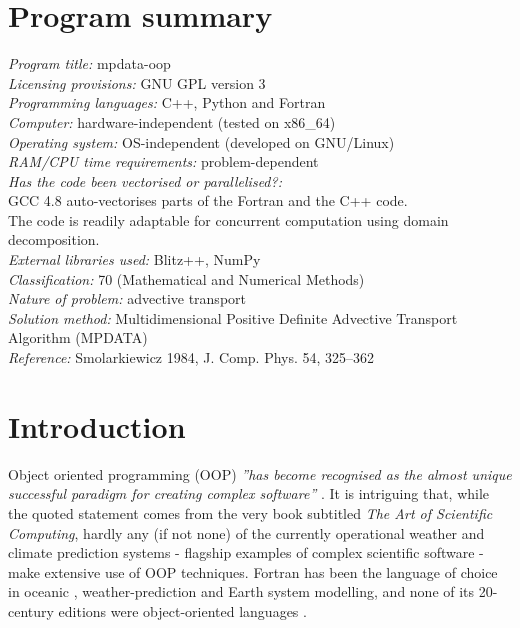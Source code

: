 \documentclass[review,peprint,10pt,5p,times]{elsarticle}
\begin{document}
\section*{Program summary}
\noindent
{\it Program title:} mpdata-oop\\
{\it Licensing provisions:} GNU GPL version 3\\
{\it Programming languages:} C++, Python and Fortran\\
{\it Computer:} hardware-independent (tested on x86\_64)\\
{\it Operating system:} OS-independent (developed on GNU/Linux)\\
{\it RAM/CPU time requirements:} problem-dependent\\
{\it Has the code been vectorised or parallelised?:}\\ 
  GCC 4.8 auto-vectorises parts of the Fortran and the C++ code.\\
  The code is readily adaptable for concurrent computation using
  domain decomposition.\\
{\it External libraries used:} Blitz++, NumPy\\
{\it Classification:} 70 (Mathematical and Numerical Methods)\\
{\it Nature of problem:} advective transport\\
{\it Solution method:} Multidimensional Positive Definite Advective Transport Algorithm (MPDATA)\\
{\it Reference:} Smolarkiewicz 1984, J. Comp. Phys. 54, 325--362

  \tableofcontents

  \section{Introduction}

  Object oriented programming (OOP) {\em ''has become recognised as the almost unique successful 
    paradigm for creating complex software''} \citep[][Sec.~1.3]{Press_et_al_2007}.
  It is intriguing that, while the quoted statement comes from the very book subtitled 
   {\em The Art of Scientific Computing}, hardly any (if not none) of the currently operational 
    weather and climate prediction systems - flagship examples of complex scientific software - 
    make extensive use of OOP techniques.
  Fortran has been the language of choice in oceanic \citep{Griffies_et_al_2000}, 
    weather-prediction \citep{Sundberg_2009} and Earth system \citep{Legutke_2012} modelling, 
    and none of its 20-century editions were object-oriented languages \citep[see e.g.][for discussion]{Norton_et_al_2007}.
\end{document}
